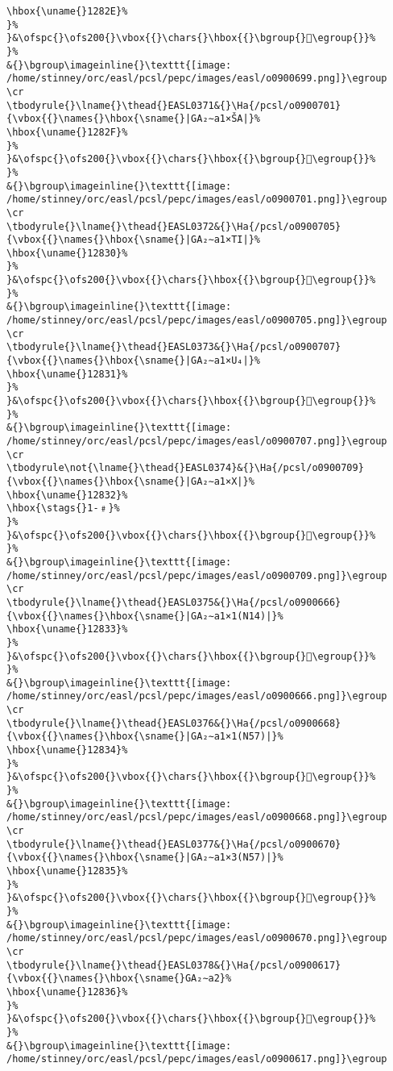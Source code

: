 \begin{verbatim}
\hbox{\uname{}1282E}%
}%
}&\ofspc{}\ofs200{}\vbox{{}\chars{}\hbox{{}\bgroup{}𒠮\egroup{}}%
}%
&{}\bgroup\imageinline{}\texttt{[image: /home/stinney/orc/easl/pcsl/pepc/images/easl/o0900699.png]}\egroup
\cr
\tbodyrule{}\lname{}\thead{}EASL0371&{}\Ha{/pcsl/o0900701}{\vbox{{}\names{}\hbox{\sname{}|GA₂∼a1×ŠA|}%
\hbox{\uname{}1282F}%
}%
}&\ofspc{}\ofs200{}\vbox{{}\chars{}\hbox{{}\bgroup{}𒠯\egroup{}}%
}%
&{}\bgroup\imageinline{}\texttt{[image: /home/stinney/orc/easl/pcsl/pepc/images/easl/o0900701.png]}\egroup
\cr
\tbodyrule{}\lname{}\thead{}EASL0372&{}\Ha{/pcsl/o0900705}{\vbox{{}\names{}\hbox{\sname{}|GA₂∼a1×TI|}%
\hbox{\uname{}12830}%
}%
}&\ofspc{}\ofs200{}\vbox{{}\chars{}\hbox{{}\bgroup{}𒠰\egroup{}}%
}%
&{}\bgroup\imageinline{}\texttt{[image: /home/stinney/orc/easl/pcsl/pepc/images/easl/o0900705.png]}\egroup
\cr
\tbodyrule{}\lname{}\thead{}EASL0373&{}\Ha{/pcsl/o0900707}{\vbox{{}\names{}\hbox{\sname{}|GA₂∼a1×U₄|}%
\hbox{\uname{}12831}%
}%
}&\ofspc{}\ofs200{}\vbox{{}\chars{}\hbox{{}\bgroup{}𒠱\egroup{}}%
}%
&{}\bgroup\imageinline{}\texttt{[image: /home/stinney/orc/easl/pcsl/pepc/images/easl/o0900707.png]}\egroup
\cr
\tbodyrule\not{\lname{}\thead{}EASL0374}&{}\Ha{/pcsl/o0900709}{\vbox{{}\names{}\hbox{\sname{}|GA₂∼a1×X|}%
\hbox{\uname{}12832}%
\hbox{\stags{}1-﹟}%
}%
}&\ofspc{}\ofs200{}\vbox{{}\chars{}\hbox{{}\bgroup{}𒠲\egroup{}}%
}%
&{}\bgroup\imageinline{}\texttt{[image: /home/stinney/orc/easl/pcsl/pepc/images/easl/o0900709.png]}\egroup
\cr
\tbodyrule{}\lname{}\thead{}EASL0375&{}\Ha{/pcsl/o0900666}{\vbox{{}\names{}\hbox{\sname{}|GA₂∼a1×1(N14)|}%
\hbox{\uname{}12833}%
}%
}&\ofspc{}\ofs200{}\vbox{{}\chars{}\hbox{{}\bgroup{}𒠳\egroup{}}%
}%
&{}\bgroup\imageinline{}\texttt{[image: /home/stinney/orc/easl/pcsl/pepc/images/easl/o0900666.png]}\egroup
\cr
\tbodyrule{}\lname{}\thead{}EASL0376&{}\Ha{/pcsl/o0900668}{\vbox{{}\names{}\hbox{\sname{}|GA₂∼a1×1(N57)|}%
\hbox{\uname{}12834}%
}%
}&\ofspc{}\ofs200{}\vbox{{}\chars{}\hbox{{}\bgroup{}𒠴\egroup{}}%
}%
&{}\bgroup\imageinline{}\texttt{[image: /home/stinney/orc/easl/pcsl/pepc/images/easl/o0900668.png]}\egroup
\cr
\tbodyrule{}\lname{}\thead{}EASL0377&{}\Ha{/pcsl/o0900670}{\vbox{{}\names{}\hbox{\sname{}|GA₂∼a1×3(N57)|}%
\hbox{\uname{}12835}%
}%
}&\ofspc{}\ofs200{}\vbox{{}\chars{}\hbox{{}\bgroup{}𒠵\egroup{}}%
}%
&{}\bgroup\imageinline{}\texttt{[image: /home/stinney/orc/easl/pcsl/pepc/images/easl/o0900670.png]}\egroup
\cr
\tbodyrule{}\lname{}\thead{}EASL0378&{}\Ha{/pcsl/o0900617}{\vbox{{}\names{}\hbox{\sname{}GA₂∼a2}%
\hbox{\uname{}12836}%
}%
}&\ofspc{}\ofs200{}\vbox{{}\chars{}\hbox{{}\bgroup{}𒠶\egroup{}}%
}%
&{}\bgroup\imageinline{}\texttt{[image: /home/stinney/orc/easl/pcsl/pepc/images/easl/o0900617.png]}\egroup

\end{verbatim}
